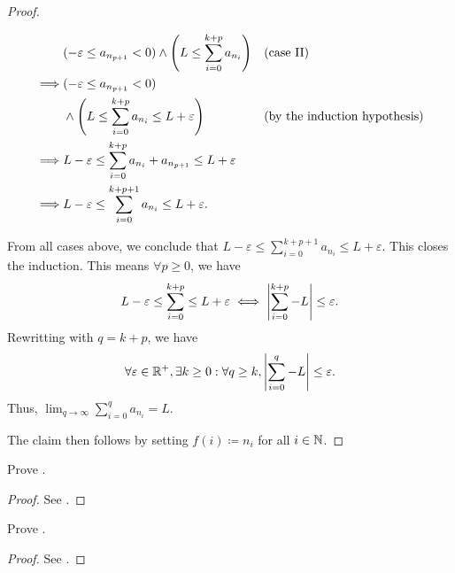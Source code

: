 \begin{proof}
\begin{itemize}
\begin{itemize}
\begin{align*}
                             & (-\varepsilon \leq a_{n_{p + 1}} < 0) \land \Bigg(L \leq \sum_{i = 0}^{k + p} a_{n_i}\Bigg) &  & \text{(case II)} \\
                    \implies & (-\varepsilon \leq a_{n_{p + 1}} < 0)                                                                             \\
                             & \land \Bigg(L \leq \sum_{i = 0}^{k + p} a_{n_i} \leq L + \varepsilon\Bigg)                  &  & \text{(by the induction hypothesis)}            \\
                    \implies & L - \varepsilon \leq \sum_{i = 0}^{k + p} a_{n_i} + a_{n_{p + 1}} \leq L + \varepsilon                            \\
                    \implies & L - \varepsilon \leq \sum_{i = 0}^{k + p + 1} a_{n_i} \leq L + \varepsilon.
                  \end{align*}
          \end{itemize}
          From all cases above, we conclude that \(L - \varepsilon \leq \sum_{i = 0}^{k + p + 1} a_{n_i} \leq L + \varepsilon\).
          This closes the induction.
          This means \(\forall p \geq 0\), we have
          \[
            L - \varepsilon \leq \sum_{i = 0}^{k + p} \leq L + \varepsilon \iff \left\lvert\sum_{i = 0}^{k + p} - L\right\rvert \leq \varepsilon.
          \]
          Rewritting with \(q = k + p\), we have
          \[
            \forall \varepsilon \in \mathbb{R}^+, \exists k \geq 0 : \forall q \geq k, \left\lvert\sum_{i = 0}^q - L\right\rvert \leq \varepsilon.
          \]
          Thus, \(\lim_{q \to \infty} \sum_{i = 0}^q a_{n_i} = L\).
  \end{itemize}
  The claim then follows by setting \(f(i) \coloneqq n_i\) for all \(i \in \mathbb{N}\).
\end{proof}

\exercisesection

\begin{ex}\label{i:ex:8.2.1}
  Prove .
\end{ex}

\begin{proof}
  See .
\end{proof}

\begin{ex}\label{i:ex:8.2.2}
  Prove .
\end{ex}

\begin{proof}
  See .
\end{proof}

